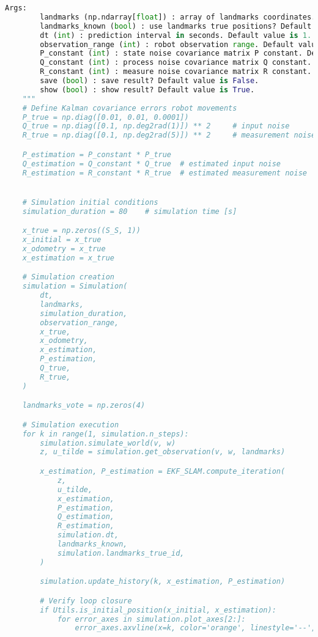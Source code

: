 \documentclass[../CSC_5RO12_TA_TP4.tex]{subfiles}
\begin{document}
\begin{scriptsize}
\begin{lstlisting}[language=Python]
    Args:
        landmarks (np.ndarray[float]) : array of landmarks coordinates.
        landmarks_known (bool) : use landmarks true positions? Default value is True.
        dt (int) : prediction interval in seconds. Default value is 1.
        observation_range (int) : robot observation range. Default value is 10.
        P_constant (int) : state noise covariance matrix P constant. Default value is 1.
        Q_constant (int) : process noise covariance matrix Q constant. Default value is 1.
        R_constant (int) : measure noise covariance matrix R constant. Default value is 1.
        save (bool) : save result? Default value is False.
        show (bool) : show result? Default value is True.
    """
    # Define Kalman covariance errors robot movements
    P_true = np.diag([0.01, 0.01, 0.0001])
    Q_true = np.diag([0.1, np.deg2rad(1)]) ** 2     # input noise
    R_true = np.diag([0.1, np.deg2rad(5)]) ** 2     # measurement noise

    P_estimation = P_constant * P_true
    Q_estimation = Q_constant * Q_true  # estimated input noise
    R_estimation = R_constant * R_true  # estimated measurement noise


    # Simulation initial conditions
    simulation_duration = 80    # simulation time [s]

    x_true = np.zeros((S_S, 1))
    x_initial = x_true
    x_odometry = x_true
    x_estimation = x_true

    # Simulation creation
    simulation = Simulation(
        dt,
        landmarks,
        simulation_duration,
        observation_range,
        x_true,
        x_odometry,
        x_estimation,
        P_estimation,
        Q_true,
        R_true,
    )

    landmarks_vote = np.zeros(4)

    # Simulation execution
    for k in range(1, simulation.n_steps):
        simulation.simulate_world(v, w)
        z, u_tilde = simulation.get_observation(v, w, landmarks)

        x_estimation, P_estimation = EKF_SLAM.compute_iteration(
            z,
            u_tilde,
            x_estimation,
            P_estimation,
            Q_estimation,
            R_estimation,
            simulation.dt,
            landmarks_known,
            simulation.landmarks_true_id,
        )

        simulation.update_history(k, x_estimation, P_estimation)

        # Verify loop closure
        if Utils.is_initial_position(x_initial, x_estimation):
            for error_axes in simulation.plot_axes[2:]:
                error_axes.axvline(x=k, color='orange', linestyle='--', linewidth=1)


\end{lstlisting}
\end{scriptsize}
\end{document}

